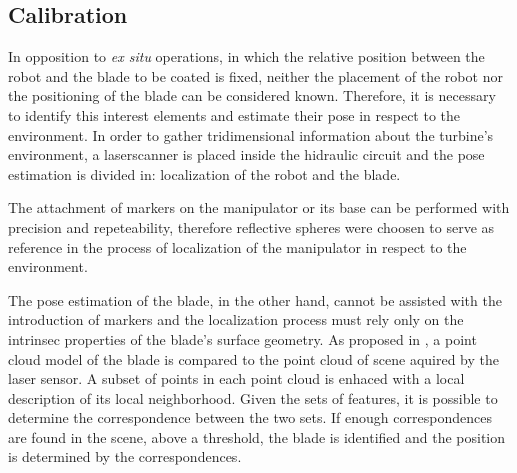 \subsection{Calibration}

In opposition to \textit{ex situ} operations, in which the relative position
between the robot and the blade to be coated is fixed, neither the placement of
the robot nor the positioning of the blade can be considered known. Therefore,
it is necessary to identify this interest elements and estimate their pose in
respect to the environment. In order to gather
tridimensional information about the turbine's environment, a laserscanner is
placed inside the hidraulic circuit and the pose estimation is
divided in: localization of the robot and the blade.
 
The attachment of markers on the manipulator or its base can be performed with
precision and repeteability, therefore reflective spheres were choosen to serve
as reference in the process of localization of the manipulator in respect to the
environment.

The pose estimation of the blade, in the other hand, cannot be assisted with the
introduction of markers and the localization process must rely only on the
intrinsec properties of the blade's surface geometry. As proposed in
\cite{Tombari2010a}, a point cloud model of the blade is compared to the point
cloud of scene aquired by the laser sensor. A subset of points in each point
cloud is enhaced with a local description of its local neighborhood. Given the
sets of features, it is possible to determine the correspondence between the two
sets. If enough correspondences are found in the scene, above a threshold, the
blade is identified and the position is determined by the correspondences.	
